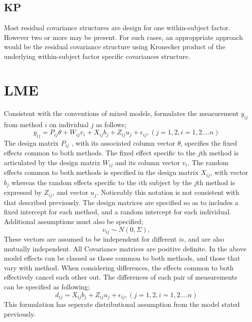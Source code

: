 \documentclass[12pt, a4paper]{report}
\theoremstyle{plain}
\theoremstyle{definition}
\theoremstyle{remark}
\begin{document}
\subsection{KP}
Most residual covariance structures are design for one
within-subject factor. However two or more may be present. For
such cases, an approppriate approach would be the residual
covariance structure using Kronecker product of the underlying
within-subject factor specific covariances structure.

\section{LME}
Consistent with the conventions of mixed models, \citet{pkc}
formulates the measurement $y_{ij} $from method $i$ on individual
$j$ as follows;
\begin{equation}
y_{ij} =P_{ij}\theta + W_{ij}v_{i} + X_{ij}b_{j} + Z_{ij}u_{j} +
\epsilon_{ij},     (j=1,2, i=1,2....n)
\end{equation}
The design matrix $P_{ij}$ , with its associated column vector
$\theta$, specifies the fixed effects common to both methods. The
fixed effect specific to the $j$th method is articulated by the
design matrix $W_{ij}$ and its column vector $v_{i}$. The random
effects common to both methods is specified in the design matrix
$X_{ij}$, with vector $b_{j}$ whereas the random effects specific
to the $i$th subject by the $j$th method is expressed by $Z_{ij}$,
and vector $u_{j}$. Noticeably this notation is not consistent
with that described previously.  The design matrices are specified
so as to includes a fixed intercept for each method, and a random
intercept for each individual. Additional assumptions must also be
specified;
\begin{equation}
v_{ij} \sim N(0,\Sigma),
\end{equation}
These vectors are assumed to be independent for different $i$s,
and are also mutually independent. All Covariance matrices are
positive definite.  In the above model effects can be classed as
those common to both methods, and those that vary with method.
When considering differences, the effects common to both
effectively cancel each other out. The differences of each pair of
measurements can be specified as following;
\begin{equation}
d_{ij} = X_{ij}b_{j} + Z_{ij}u_{j} + \epsilon_{ij},     (j=1,2,
i=1,2....n)
\end{equation}
This formulation has seperate distributional assumption from the
model stated previously.
\end{document}
